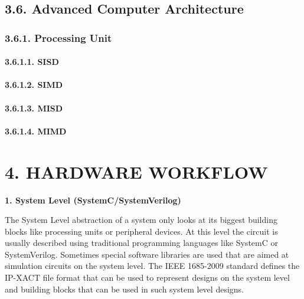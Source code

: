 \documentclass[
]{article}
\begin{document}
\hypertarget{advanced-computer-architecture-1}{%
\subsection{3.6. Advanced Computer
Architecture}\label{advanced-computer-architecture-1}}

\hypertarget{processing-unit-1}{%
\subsubsection{3.6.1. Processing Unit}\label{processing-unit-1}}

\hypertarget{sisd-1}{%
\paragraph{3.6.1.1. SISD}\label{sisd-1}}

\hypertarget{simd-1}{%
\paragraph{3.6.1.2. SIMD}\label{simd-1}}

\hypertarget{misd-1}{%
\paragraph{3.6.1.3. MISD}\label{misd-1}}

\hypertarget{mimd-1}{%
\paragraph{3.6.1.4. MIMD}\label{mimd-1}}

\hypertarget{hardware-workflow-1}{%
\section{4. HARDWARE WORKFLOW}\label{hardware-workflow-1}}

\textbf{1. System Level (SystemC/SystemVerilog)}

The System Level abstraction of a system only looks at its biggest
building blocks like processing units or peripheral devices. At this
level the circuit is usually described using traditional programming
languages like SystemC or SystemVerilog. Sometimes special software
libraries are used that are aimed at simulation circuits on the system
level. The IEEE 1685-2009 standard defines the IP-XACT file format that
can be used to represent designs on the system level and building blocks
that can be used in such system level designs.
\end{document}
